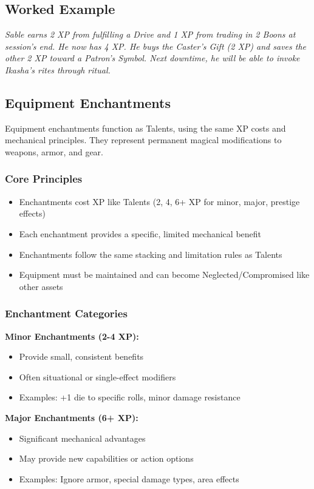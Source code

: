 \subsection{Worked Example}
\emph{Sable earns 2 XP from fulfilling a Drive and 1 XP from trading in 2 Boons at session’s end. He now has 4 XP. He buys the Caster’s Gift (2 XP) and saves the other 2 XP toward a Patron’s Symbol. Next downtime, he will be able to invoke Ikasha’s rites through ritual.}

\subsection{Equipment Enchantments}

Equipment enchantments function as Talents, using the same XP costs and mechanical principles. They represent permanent magical modifications to weapons, armor, and gear.

\subsubsection{Core Principles}

\begin{itemize}
\item Enchantments cost XP like Talents (2, 4, 6+ XP for minor, major, prestige effects)
\item Each enchantment provides a specific, limited mechanical benefit
\item Enchantments follow the same stacking and limitation rules as Talents
\item Equipment must be maintained and can become Neglected/Compromised like other assets
\end{itemize}

\subsubsection{Enchantment Categories}

\textbf{Minor Enchantments (2-4 XP):}
\begin{itemize}
\item Provide small, consistent benefits
\item Often situational or single-effect modifiers
\item Examples: +1 die to specific rolls, minor damage resistance
\end{itemize}

\textbf{Major Enchantments (6+ XP):}
\begin{itemize}
\item Significant mechanical advantages
\item May provide new capabilities or action options
\item Examples: Ignore armor, special damage types, area effects
\end{itemize}

